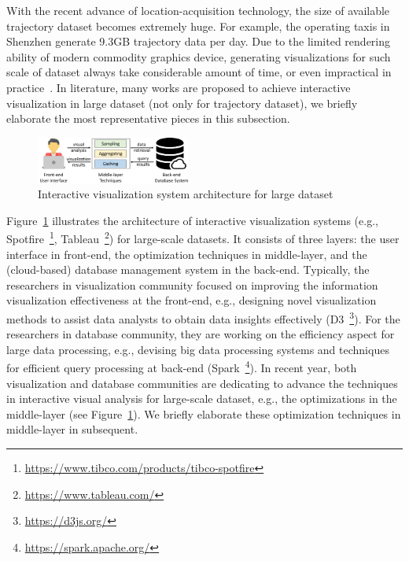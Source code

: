 With the recent advance of location-acquisition technology, the size of available trajectory dataset becomes extremely huge.
For example, the operating taxis in Shenzhen generate 9.3GB trajectory data per day.
Due to the limited rendering ability of modern commodity graphics device, generating visualizations for such scale of dataset always take considerable amount of time,
or even impractical in practice~\cite{park2016visualization}.
In literature, many works are proposed to achieve interactive visualization in large dataset (not only for trajectory dataset), we briefly elaborate the most representative pieces in this subsection.

\begin{figure}
	\centering
	\includegraphics[width=0.45\textwidth]{pictures/framework/framework.pdf}
	\caption{Interactive visualization system architecture for large dataset}
	\label{fig:framework}
\end{figure}

Figure~\ref{fig:framework} illustrates the architecture of interactive visualization systems (e.g., Spotfire~\footnote{\url{https://www.tibco.com/products/tibco-spotfire}}, Tableau~\footnote{\url{https://www.tableau.com/}}) for large-scale datasets.
It consists of three layers: the user interface in front-end, the optimization techniques in middle-layer, and the (cloud-based) database management system in the back-end.
Typically, the researchers in visualization community focused on improving the information visualization effectiveness at the front-end,
e.g., designing novel visualization methods to assist data analysts to obtain data insights effectively (D3~\footnote{\url{https://d3js.org/}}).
For the researchers in database community, they are working on the efficiency aspect for large data processing,
e.g., devising big data processing systems and techniques for efficient query processing at back-end (Spark~\footnote{\url{https://spark.apache.org/}}).
In recent year, both visualization and database communities are dedicating to advance the techniques in interactive visual analysis for large-scale dataset,
e.g., the optimizations in the middle-layer (see Figure~\ref{fig:framework}).
We briefly elaborate these optimization techniques in middle-layer in subsequent. %

